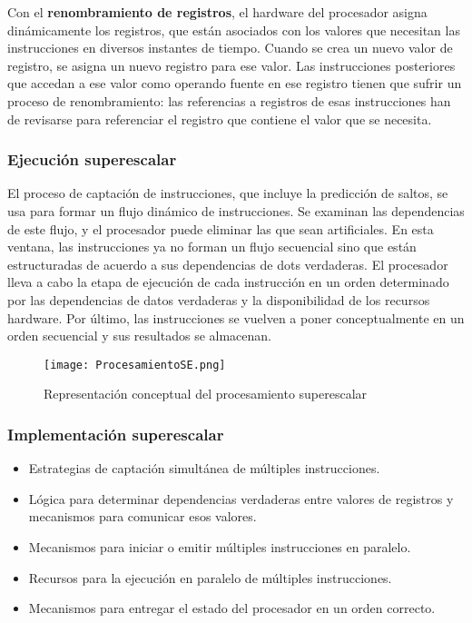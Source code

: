 Con el \textbf{renombramiento de registros}, el hardware del procesador asigna dinámicamente los registros, que están asociados con los valores que necesitan las instrucciones en diversos instantes de tiempo. Cuando se crea un nuevo valor de registro, se asigna un nuevo registro para ese valor. Las instrucciones posteriores que accedan a ese valor como operando fuente en ese registro tienen que sufrir un proceso de renombramiento: las referencias a registros de esas instrucciones han de revisarse para referenciar el registro que contiene el valor que se necesita. 

\subsubsection*{Ejecución superescalar}

El proceso de captación de instrucciones, que incluye la predicción de saltos, se usa para formar un flujo dinámico de instrucciones. Se examinan las dependencias de este flujo, y el procesador puede eliminar las que sean artificiales. En esta ventana, las instrucciones ya no forman un flujo secuencial sino que están estructuradas de acuerdo a sus dependencias de dots verdaderas. El procesador lleva a cabo la etapa de ejecución de cada instrucción en un orden determinado por las dependencias de datos verdaderas y la disponibilidad de los recursos hardware. Por último, las instrucciones se vuelven a poner conceptualmente en un orden secuencial y sus resultados se almacenan.

\begin{figure}
  \centering
  \texttt{[image: ProcesamientoSE.png]}
  \caption{Representación conceptual del procesamiento superescalar}
\end{figure}

\subsubsection*{Implementación superescalar}

\begin{itemize}
  \item Estrategias de captación simultánea de múltiples instrucciones.
  \item Lógica para determinar dependencias verdaderas entre valores de registros y mecanismos para comunicar esos valores.
  \item Mecanismos para iniciar o emitir múltiples instrucciones en paralelo.
  \item Recursos para la ejecución en paralelo de múltiples instrucciones.
  \item Mecanismos para entregar el estado del procesador en un orden correcto.
\end{itemize}

